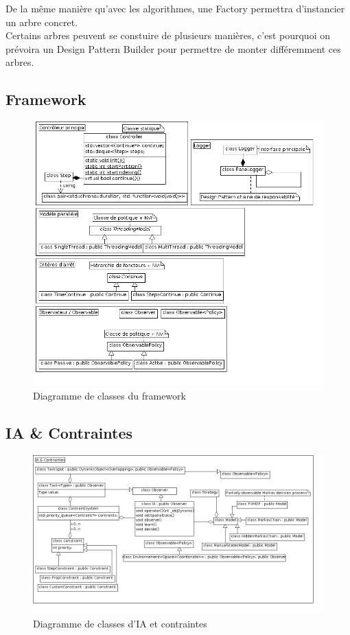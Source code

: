 De la même manière qu'avec les algorithmes, une Factory permettra d'instancier un arbre concret.\\
Certains arbres peuvent se constuire de plusieurs manières, c'est pourquoi on prévoira un Design Pattern Builder pour permettre de monter différemment ces arbres.

\newpage
\subsection{Framework}
\begin{figure}[!h]\centering
   \includegraphics[scale=0.6]{images/c_framework.png}
   \caption{\label{c_framework} Diagramme de classes du framework}
\end{figure}

\newpage
\subsection{IA \& Contraintes}
\begin{figure}[!h]\centering
   \includegraphics[angle=90, scale=0.5]{images/c_ia_contraintes.png}
   \caption{\label{c_ia_contraintes} Diagramme de classes d'IA et contraintes}
\end{figure}

